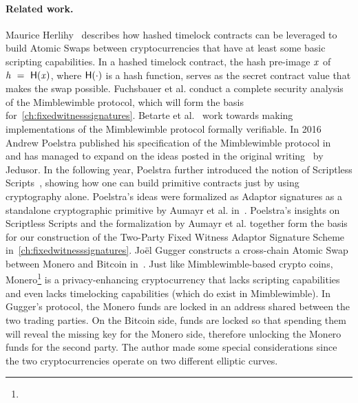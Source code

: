 \paragraph{Related work.} Maurice Herlihy~\cite{herlihy2018atomic} describes how hashed timelock contracts can be leveraged to build Atomic Swaps between cryptocurrencies that have at least some basic scripting capabilities.
In a hashed timelock contract, the hash pre-image $\mathit{x}$ of $\mathit{h} ~=~ \mathsf{H} (\mathit{x})$, where $\mathsf{H} (\cdot)$ is a hash function, serves as the secret contract value that makes the swap possible.
Fuchsbauer et al. conduct a complete security analysis of the Mimblewimble protocol, which will form the basis for~\cref{ch:fixedwitnesssignatures}.
Betarte et al.~\cite{betarte2019towards} work towards making implementations of the Mimblewimble protocol formally verifiable.
In 2016 Andrew Poelstra published his specification of the Mimblewimble protocol in~\cite{poelstra2016mimblewimble} and has managed to expand on the ideas posted in the original writing~\cite{jedusor2016mimblewimble} by Jedusor.
In the following year, Poelstra further introduced the notion of Scriptless Scripts~\cite{poelstra2017scriptless}, showing how one can build primitive contracts just by using cryptography alone.
Poelstra's ideas were formalized as Adaptor signatures as a standalone cryptographic primitive by Aumayr et al. in~\cite{aumayr2020bitcoinchannels}.
Poelstra's insights on Scriptless Scripts and the formalization by Aumayr et al. together form the basis for our construction of the Two-Party Fixed Witness Adaptor Signature Scheme in~\cref{ch:fixedwitnesssignatures}.
Joël Gugger constructs a cross-chain Atomic Swap between Monero and Bitcoin in~\cite{gugger2020bitcoin}.
Just like Mimblewimble-based crypto coins, Monero\footnote{\urlmonero} is a privacy-enhancing cryptocurrency that lacks scripting capabilities and even lacks timelocking capabilities (which do exist in Mimblewimble).
In Gugger's protocol, the Monero funds are locked in an address shared between the two trading parties.
On the Bitcoin side, funds are locked so that spending them will reveal the missing key for the Monero side, therefore unlocking the Monero funds for the second party.
The author made some special considerations since the two cryptocurrencies operate on two different elliptic curves.


